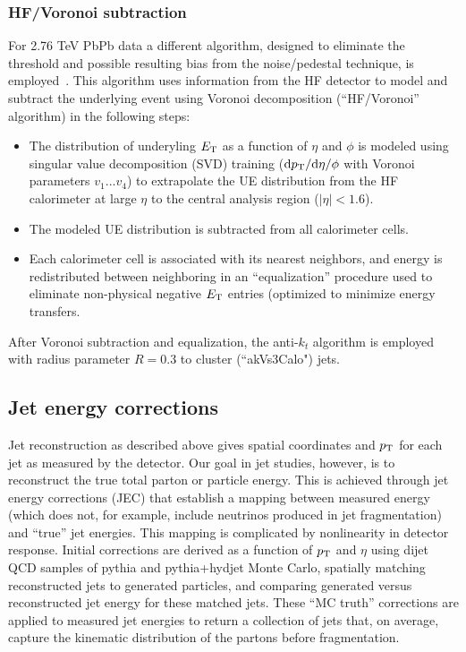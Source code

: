 \subsubsection{HF/Voronoi subtraction}
For 2.76 TeV PbPb data a different algorithm, designed to eliminate the threshold and possible resulting bias from the noise/pedestal technique, is employed~\cite{AN_2014_024}.  This algorithm uses information from the HF detector to model and subtract the underlying event using Voronoi decomposition (``HF/Voronoi'' algorithm) in the following steps: 
\begin{itemize}
\item The distribution of underyling $E_{\rm T}$ as a function of $\eta$ and $\phi$ is modeled using singular value decomposition (SVD) training (${\rm d}p_{\rm T}/{\rm d}\eta / {\rm }\phi$ with Voronoi parameters $v_{1}...v_{4}$) to extrapolate the UE distribution from the HF calorimeter at large $\eta$ to the central analysis region ($|\eta| < 1.6$).
\item The modeled UE distribution is subtracted from all calorimeter cells.
\item Each calorimeter cell is associated with its nearest neighbors, and energy is redistributed between neighboring in an ``equalization'' procedure used to eliminate non-physical negative $E_{\rm T}$ entries (optimized to minimize energy transfers.
\end{itemize}

\noindent After Voronoi subtraction and equalization, the anti-$k_{t}$ algorithm is employed with radius parameter $R = 0.3$ to cluster (``akVs3Calo") jets.

\subsection{Jet energy corrections}

Jet reconstruction as described above gives spatial coordinates and $p_{\rm T}$ for each jet as measured by the detector.  Our goal in jet studies, however, is to reconstruct the true total parton or particle energy.  This is achieved through jet energy corrections (JEC) that establish a mapping between measured energy (which does not, for example, include neutrinos produced in jet fragmentation) and ``true'' jet energies.  This mapping is complicated by nonlinearity in detector response.  Initial corrections are derived as a function of $p_{\rm T}$ and $\eta$ using dijet QCD samples of {\sc pythia} and {\sc pythia+hydjet} Monte Carlo, spatially matching reconstructed jets to generated particles, and comparing generated versus reconstructed jet energy for these matched jets.  These ``MC truth'' corrections are applied to measured jet energies to return a collection of jets that, on average, capture the kinematic distribution of the partons before fragmentation.

